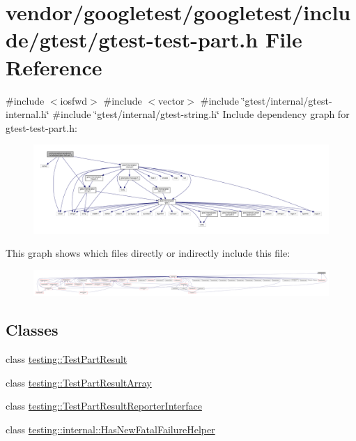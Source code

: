 \hypertarget{gtest-test-part_8h}{}\section{vendor/googletest/googletest/include/gtest/gtest-\/test-\/part.h File Reference}
\label{gtest-test-part_8h}
{\ttfamily \#include $<$iosfwd$>$}\newline
{\ttfamily \#include $<$vector$>$}\newline
{\ttfamily \#include \char`\"{}gtest/internal/gtest-\/internal.\+h\char`\"{}}\newline
{\ttfamily \#include \char`\"{}gtest/internal/gtest-\/string.\+h\char`\"{}}\newline
Include dependency graph for gtest-\/test-\/part.h\+:
\nopagebreak
\begin{figure}[H]
\begin{center}
\leavevmode
\includegraphics[width=350pt]{gtest-test-part_8h__incl}
\end{center}
\end{figure}
This graph shows which files directly or indirectly include this file\+:
\nopagebreak
\begin{figure}[H]
\begin{center}
\leavevmode
\includegraphics[width=350pt]{gtest-test-part_8h__dep__incl}
\end{center}
\end{figure}
\subsection*{Classes}
\begin{DoxyCompactItemize}
\item 
class \hyperlink{classtesting_1_1_test_part_result}{testing\+::\+Test\+Part\+Result}
\item 
class \hyperlink{classtesting_1_1_test_part_result_array}{testing\+::\+Test\+Part\+Result\+Array}
\item 
class \hyperlink{classtesting_1_1_test_part_result_reporter_interface}{testing\+::\+Test\+Part\+Result\+Reporter\+Interface}
\item 
class \hyperlink{classtesting_1_1internal_1_1_has_new_fatal_failure_helper}{testing\+::internal\+::\+Has\+New\+Fatal\+Failure\+Helper}
\end{DoxyCompactItemize}
